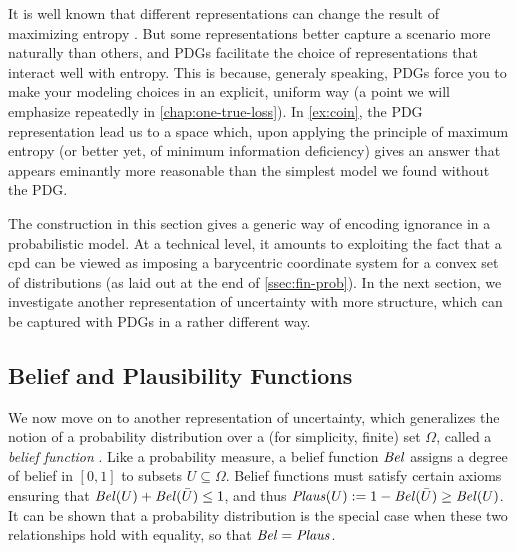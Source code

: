 It is well known that different representations can change the result of maximizing entropy \citep{seidenfeld1986entropy,critique-maxent,friedman1971jaynes}. 
But some representations better capture a scenario more naturally than others, and PDGs 
facilitate the choice of representations that interact well with entropy. 
This is because, generaly speaking, PDGs force you to make your modeling choices in an explicit, uniform way (a point we will emphasize repeatedly in \cref{chap:one-true-loss}).
In \cref{ex:coin}, the PDG representation lead us to a space which, upon applying the principle of maximum entropy (or better yet, of minimum information deficiency) gives an answer that appears eminantly more reasonable than the simplest model we found without the PDG. 
%

The construction in this section gives a generic way of 
    encoding ignorance in a probabilistic model. 
At a technical level, it amounts to exploiting the fact that a cpd can be viewed as imposing a barycentric coordinate system for a convex set of distributions (as laid out at the end of \cref{ssec:fin-prob}).
In the next section, we investigate another representation of uncertainty with more structure, which can be captured with PDGs in a rather different way.


\subsection{Belief and Plausibility Functions}
    \label{ssec:belplaus-as-pdg}
    
We now move on to another representation of uncertainty, which generalizes the notion of a probability distribution over a (for simplicity, finite) set $\Omega$, called a \emph{belief function} \citep{shafer1976mathematical}. 
Like a probability measure,
a belief function $\mathit{Bel}$ assigns a degree of belief in $[0,1]$ to subsets $U \subseteq \Omega$.  
Belief functions must satisfy certain axioms ensuring that $\mathit{Bel}(U) + \mathit{Bel}(\bar U) \le 1$, and thus $\mathit{Plaus}(U) := 1 - \mathit{Bel}(\bar U) \ge \mathit{Bel}(U)$. 
It can be shown that a probability distribution is the special case when these two relationships hold with equality, so that $\mathit{Bel} = \mathit{Plaus}$.  

